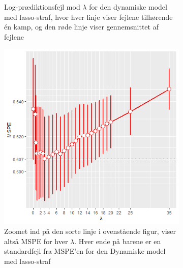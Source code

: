 \documentclass[11pt,a4paper]{article}
\begin{document}
\begin{figure}[h!]
\begin{subfigure}[b]{0.425\linewidth}
    \caption{Log-prædiktionsfejl mod $\lambda$ for den dynamiske model med lasso-straf, hvor hver linje viser fejlene tilhørende én kamp, og den røde linje viser gennemsnittet af fejlene}
    \label{fig:DynLogLossLine}  
    \end{subfigure}
  \begin{subfigure}[b]{0.425\linewidth}
    \includegraphics[width=\textwidth]{BARMSPENYALPHA.png}
    \caption{Zoomet ind på den sorte linje i ovenstående figur, viser altså MSPE for hver $\lambda$. Hver ende på barene er en standardfejl fra MSPE'en for den Dynamiske model med lasso-straf}
    \label{fig:MSPEBarDyn}
  \end{subfigure}
      \hspace{0.2cm}
    \begin{subfigure}[b]{0.425\linewidth}

\end{subfigure}
\end{figure}
\end{document}

